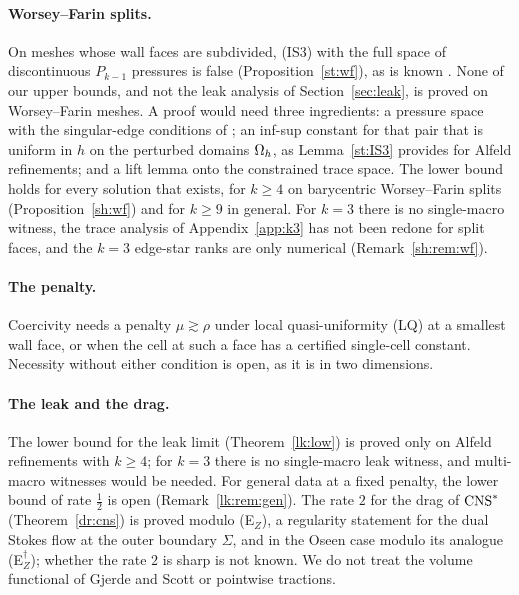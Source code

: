 \paragraph{Worsey--Farin splits.} On meshes whose wall faces are subdivided, (IS3) with the full space of discontinuous $P_{k-1}$ pressures is false (Proposition~\ref{st:wf}), as is known \cite{GuzmanLischkeNeilan2022,FabienGuzmanNeilanZytoon2022}. None of our upper bounds, and not the leak analysis of Section~\ref{sec:leak}, is proved on Worsey--Farin meshes. A proof would need three ingredients: a pressure space with the singular-edge conditions of \cite{FabienGuzmanNeilanZytoon2022}; an inf-sup constant for that pair that is uniform in $h$ on the perturbed domains $\Omega_h$, as Lemma~\ref{st:IS3} provides for Alfeld refinements; and a lift lemma onto the constrained trace space. The lower bound holds for every solution that exists, for $k\ge4$ on barycentric Worsey--Farin splits (Proposition~\ref{sh:wf}) and for $k\ge9$ in general. For $k=3$ there is no single-macro witness, the trace analysis of Appendix~\ref{app:k3} has not been redone for split faces, and the $k=3$ edge-star ranks are only numerical (Remark~\ref{sh:rem:wf}).

\paragraph{The penalty.} Coercivity needs a penalty $\mu\gtrsim\rho$ under local quasi-uniformity (LQ) at a smallest wall face, or when the cell at such a face has a certified single-cell constant. Necessity without either condition is open, as it is in two dimensions.

\paragraph{The leak and the drag.} The lower bound for the leak limit (Theorem~\ref{lk:low}) is proved only on Alfeld refinements with $k\ge4$; for $k=3$ there is no single-macro leak witness, and multi-macro witnesses would be needed. For general data at a fixed penalty, the lower bound of rate $\frac12$ is open (Remark~\ref{lk:rem:gen}). The rate $2$ for the drag of $\mathrm{CNS}^\ast$ (Theorem~\ref{dr:cns}) is proved modulo (E$_Z$), a regularity statement for the dual Stokes flow at the outer boundary $\Sigma$, and in the Oseen case modulo its analogue (E$_Z^\dagger$); whether the rate $2$ is sharp is not known. We do not treat the volume functional of Gjerde and Scott or pointwise tractions.

